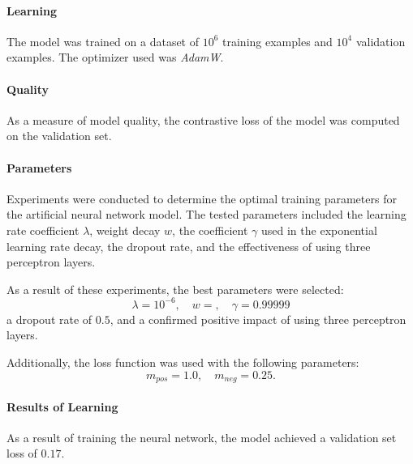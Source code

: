 \documentclass[pdflatex,sn-vancouver-num]{sn-jnl}%
\begin{document}
                \paragraph{Learning}
                The model was trained on a dataset of $10^{6}$ training examples and $10^{4}$ validation examples. The optimizer used was \textit{AdamW}\cite{Loshchilov2017DecoupledWD}.

                \paragraph{Quality}
                As a measure of model quality, the contrastive loss of the model was computed on the validation set.

                \paragraph{Parameters}
                Experiments were conducted to determine the optimal training parameters for the artificial neural network model. The tested parameters included the learning rate coefficient \( \lambda \), weight decay \( w \), the coefficient \( \gamma \) used in the exponential learning rate decay, the dropout rate, and the effectiveness of using three perceptron layers.

                As a result of these experiments, the best parameters were selected:
                \[
                \lambda = 10^{-6}, \quad w = , \quad \gamma = 0.99999
                \]
                a dropout rate of \( 0.5 \), and a confirmed positive impact of using three perceptron layers.

                Additionally, the loss function was used with the following parameters:
                \[
                m_{pos} = 1.0, \quad m_{neg} = 0.25.
                \]


                \paragraph{Results of Learning}
                As a result of training the neural network, the model achieved a validation set loss of $0.17$.

        
\end{document}
